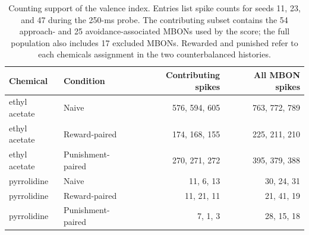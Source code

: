 \begin{table}[!htbp]
\centering
\small
\caption{Counting support of the valence index. Entries list spike counts for seeds 11, 23, and 47 during the 250-ms probe. The contributing subset contains the 54 approach- and 25 avoidance-associated MBONs used by the score; the full population also includes 17 excluded MBONs. Rewarded and punished refer to each chemical\textquotesingle s assignment in the two counterbalanced histories.}
\label{tab:memory-counts}
\begin{tabular}{llrr}
\toprule
Chemical & Condition & Contributing spikes & All MBON spikes \\
\midrule
ethyl acetate & Naive & 576, 594, 605 & 763, 772, 789 \\
ethyl acetate & Reward-paired & 174, 168, 155 & 225, 211, 210 \\
ethyl acetate & Punishment-paired & 270, 271, 272 & 395, 379, 388 \\
pyrrolidine & Naive & 11, 6, 13 & 30, 24, 31 \\
pyrrolidine & Reward-paired & 11, 21, 11 & 21, 41, 19 \\
pyrrolidine & Punishment-paired & 7, 1, 3 & 28, 15, 18 \\
\bottomrule
\end{tabular}
\end{table}
